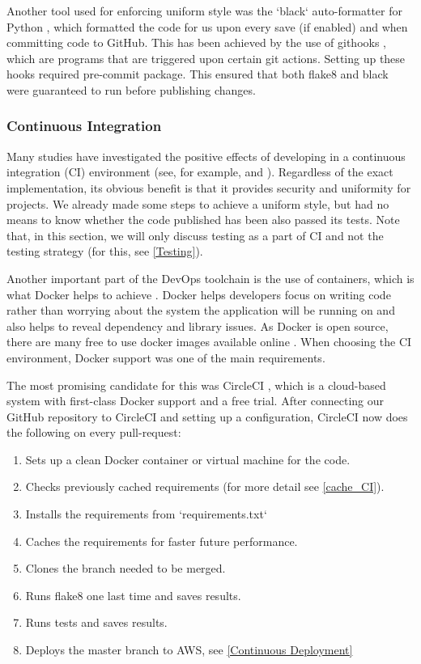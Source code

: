 \documentclass[main.tex]{subfiles}
\begin{document}
Another tool used for enforcing uniform style was the `black` auto-formatter for Python \cite{black}, which formatted the code for us upon every save (if enabled) and when committing code to GitHub. This has been achieved by the use of githooks \cite{githooks}, which are programs that are triggered upon certain git actions. Setting up these hooks required pre-commit package. This ensured that both flake8 and black were guaranteed to run before publishing changes.

\subsubsection{Continuous Integration}
\label{Continuous Integration}

Many studies have investigated the positive effects of developing in a continuous integration (CI) environment (see, for example, \cite{CI_1} and \cite{CI_2}). Regardless of the exact implementation, its obvious benefit is that it provides security and uniformity for projects. We already made some steps to achieve a uniform style, but had no means to know whether the code published has been also passed its tests. Note that, in this section, we will only discuss testing as a part of CI and not the testing strategy (for this, see \ref{Testing}).

Another important part of the DevOps toolchain is the use of containers, which is what Docker helps to achieve \cite{Docker}. Docker helps developers focus on writing code rather than worrying about the system the application will be running on and also helps to reveal dependency and library issues. As Docker is open source, there are many free to use docker images available online \cite{DockerImages}. When choosing the CI environment, Docker support was one of the main requirements.

The most promising candidate for this was CircleCI \cite{CircleCI}, which is a cloud-based system with first-class Docker support and a free trial. After connecting our GitHub repository to CircleCI and setting up a configuration, CircleCI now does the following on every pull-request:

\begin{enumerate}
    \item Sets up a clean Docker container or virtual machine for the code.
    \item Checks previously cached requirements (for more detail see \figurename{\ref{cache_CI}}).
    \item Installs the requirements from `requirements.txt`
    \item Caches the requirements for faster future performance.
    \item Clones the branch needed to be merged.
    \item Runs flake8 one last time and saves results.
    \item Runs tests and saves results.
    \item Deploys the master branch to AWS, see \ref{Continuous Deployment}
\end{enumerate}
\end{document}
